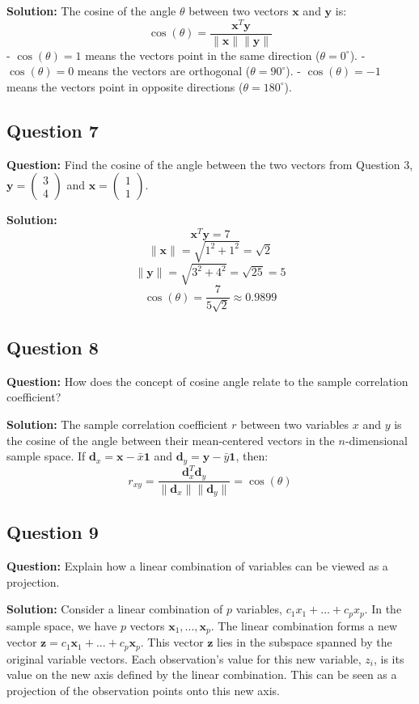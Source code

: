 \textbf{Solution:}
The cosine of the angle $\theta$ between two vectors $\mathbf{x}$ and $\mathbf{y}$ is:
$$ \cos(\theta) = \frac{\mathbf{x}^T \mathbf{y}}{\|\mathbf{x}\| \|\mathbf{y}\|} $$
- $\cos(\theta) = 1$ means the vectors point in the same direction ($\theta=0^\circ$).
- $\cos(\theta) = 0$ means the vectors are orthogonal ($\theta=90^\circ$).
- $\cos(\theta) = -1$ means the vectors point in opposite directions ($\theta=180^\circ$).

\subsection*{Question 7}
\textbf{Question:} Find the cosine of the angle between the two vectors from Question 3, $\mathbf{y} = \begin{pmatrix} 3 \\ 4 \end{pmatrix}$ and $\mathbf{x} = \begin{pmatrix} 1 \\ 1 \end{pmatrix}$.

\textbf{Solution:}
$$ \mathbf{x}^T \mathbf{y} = 7 $$
$$ \|\mathbf{x}\| = \sqrt{1^2+1^2} = \sqrt{2} $$
$$ \|\mathbf{y}\| = \sqrt{3^2+4^2} = \sqrt{25} = 5 $$
$$ \cos(\theta) = \frac{7}{5\sqrt{2}} \approx 0.9899 $$

\subsection*{Question 8}
\textbf{Question:} How does the concept of cosine angle relate to the sample correlation coefficient?

\textbf{Solution:}
The sample correlation coefficient $r$ between two variables $x$ and $y$ is the cosine of the angle between their mean-centered vectors in the $n$-dimensional sample space. If $\mathbf{d}_x = \mathbf{x} - \bar{x}\mathbf{1}$ and $\mathbf{d}_y = \mathbf{y} - \bar{y}\mathbf{1}$, then:
$$ r_{xy} = \frac{\mathbf{d}_x^T \mathbf{d}_y}{\|\mathbf{d}_x\| \|\mathbf{d}_y\|} = \cos(\theta) $$

\subsection*{Question 9}
\textbf{Question:} Explain how a linear combination of variables can be viewed as a projection.

\textbf{Solution:}
Consider a linear combination of $p$ variables, $c_1 x_1 + ... + c_p x_p$. In the sample space, we have $p$ vectors $\mathbf{x}_1, ..., \mathbf{x}_p$. The linear combination forms a new vector $\mathbf{z} = c_1 \mathbf{x}_1 + ... + c_p \mathbf{x}_p$. This vector $\mathbf{z}$ lies in the subspace spanned by the original variable vectors. Each observation's value for this new variable, $z_i$, is its value on the new axis defined by the linear combination. This can be seen as a projection of the observation points onto this new axis.

